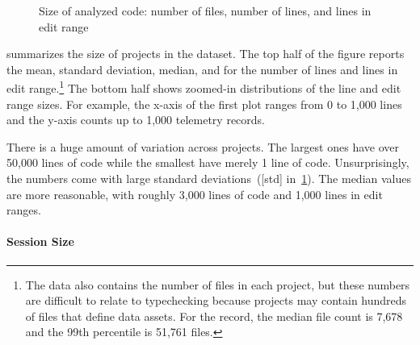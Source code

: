 \documentclass[english,submission,cleveref]{programming}
\begin{document}
\begin{figure}[t]
\begin{tabular}[t]{lrrrl}
  \end{tabular}

  \caption{Size of analyzed code: number of files, number of lines, and lines in edit range}
  \label{f:codebase-size}
\end{figure}

 summarizes the size of projects in the dataset.
The top half of the figure reports the mean, standard deviation, median,
and  for the number of lines
and lines in edit range.\footnote{The data also contains the number of files in
each project, but these numbers are difficult to relate to typechecking because
projects may contain hundreds of files that define data assets.  For the
record, the median file count is 7,678 and the 99th percentile is 51,761 files.
}
The bottom half shows zoomed-in distributions of the line and edit range
sizes.
For example, the x-axis of the first plot ranges from 0 to 1,000 lines and
the y-axis counts up to 1,000 telemetry records.

There is a huge amount of variation across projects.
The largest ones have over 50,000 lines of code
while the smallest have merely 1 line of code.
Unsurprisingly, the numbers come with large standard
deviations~([std] in~\cref{f:codebase-size}).
The median values are more reasonable, with roughly 3,000 lines of code
and 1,000 lines in edit ranges.


\paragraph{Session Size}
\end{document}
